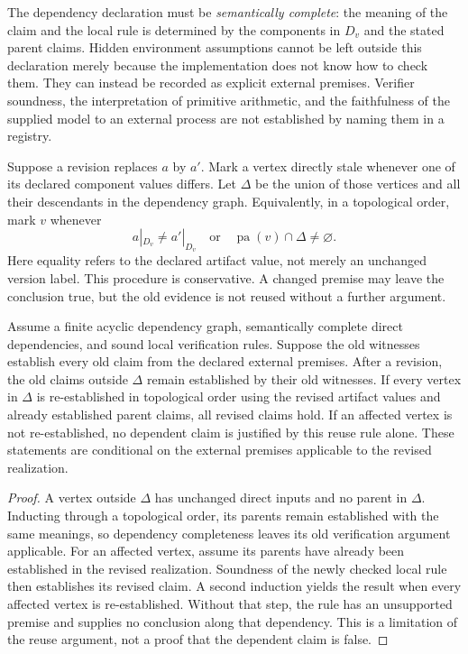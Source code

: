 The dependency declaration must be \emph{semantically complete}: the meaning of the claim and the local rule is determined by the components in $D_v$ and the stated parent claims. Hidden environment assumptions cannot be left outside this declaration merely because the implementation does not know how to check them. They can instead be recorded as explicit external premises. Verifier soundness, the interpretation of primitive arithmetic, and the faithfulness of the supplied model to an external process are not established by naming them in a registry.

Suppose a revision replaces $a$ by $a'$. Mark a vertex directly stale whenever one of its declared component values differs. Let $\Delta$ be the union of those vertices and all their descendants in the dependency graph. Equivalently, in a topological order, mark $v$ whenever
\[
 a|_{D_v}\ne a'|_{D_v}
 \quad\text{or}\quad
 \operatorname{pa}(v)\cap\Delta\ne\varnothing.
\]
Here equality refers to the declared artifact value, not merely an unchanged version label. This procedure is conservative. A changed premise may leave the conclusion true, but the old evidence is not reused without a further argument.

\begin{SIItheorem}\label{SII:thm:certificate-reuse}
Assume a finite acyclic dependency graph, semantically complete direct dependencies, and sound local verification rules. Suppose the old witnesses establish every old claim from the declared external premises. After a revision, the old claims outside $\Delta$ remain established by their old witnesses. If every vertex in $\Delta$ is re-established in topological order using the revised artifact values and already established parent claims, all revised claims hold. If an affected vertex is not re-established, no dependent claim is justified by this reuse rule alone. These statements are conditional on the external premises applicable to the revised realization.
\end{SIItheorem}
\begin{proof}
A vertex outside $\Delta$ has unchanged direct inputs and no parent in $\Delta$. Inducting through a topological order, its parents remain established with the same meanings, so dependency completeness leaves its old verification argument applicable. For an affected vertex, assume its parents have already been established in the revised realization. Soundness of the newly checked local rule then establishes its revised claim. A second induction yields the result when every affected vertex is re-established. Without that step, the rule has an unsupported premise and supplies no conclusion along that dependency. This is a limitation of the reuse argument, not a proof that the dependent claim is false.
\end{proof}

